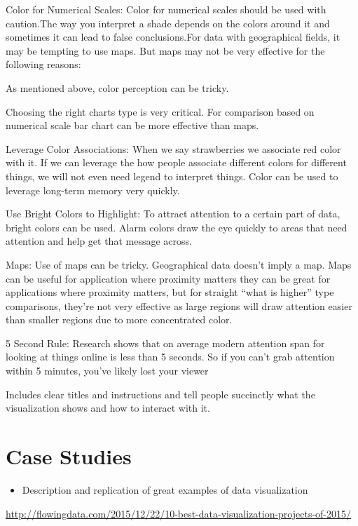 \documentclass[]{book}
\providecommand{\tightlist}{%
  \setlength{\itemsep}{0pt}\setlength{\parskip}{0pt}}
\theoremstyle{definition}
\theoremstyle{definition}
\theoremstyle{definition}
\theoremstyle{remark}
\begin{document}
Color for Numerical Scales: Color for numerical scales should be used
with caution.The way you interpret a shade depends on the colors around
it and sometimes it can lead to false conclusions.For data with
geographical fields, it may be tempting to use maps. But maps may not be
very effective for the following reasons:

As mentioned above, color perception can be tricky.

Choosing the right charts type is very critical. For comparison based on
numerical scale bar chart can be more effective than maps.

Leverage Color Associations: When we say strawberries we associate red
color with it. If we can leverage the how people associate different
colors for different things, we will not even need legend to interpret
things. Color can be used to leverage long-term memory very quickly.

Use Bright Colors to Highlight: To attract attention to a certain part
of data, bright colors can be used. Alarm colors draw the eye quickly to
areas that need attention and help get that message across.

Maps: Use of maps can be tricky. Geographical data doesn't imply a map.
Maps can be useful for application where proximity matters they can be
great for applications where proximity matters, but for straight ``what
is higher'' type comparisons, they're not very effective as large
regions will draw attention easier than smaller regions due to more
concentrated color.

5 Second Rule: Research shows that on average modern attention span for
looking at things online is less than 5 seconds. So if you can't grab
attention within 5 minutes, you've likely lost your viewer

Includes clear titles and instructions and tell people succinctly what
the visualization shows and how to interact with it.

\chapter{Case Studies}\label{case-studies}

\begin{itemize}
\tightlist
\item
  Description and replication of great examples of data visualization
\end{itemize}

\url{http://flowingdata.com/2015/12/22/10-best-data-visualization-projects-of-2015/}
\end{document}
